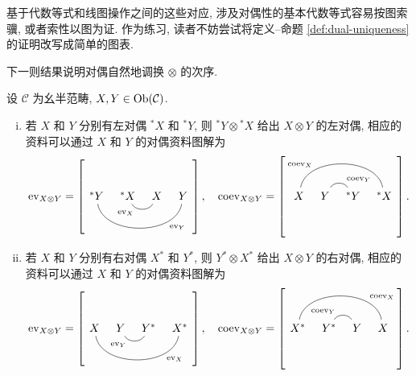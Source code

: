 基于代数等式和线图操作之间的这些对应, 涉及对偶性的基本代数等式容易按图索骥, 或者索性以图为证. 作为练习, 读者不妨尝试将定义--命题 \ref{def:dual-uniqueness} 的证明改写成简单的图表.

下一则结果说明对偶自然地调换 $\otimes$ 的次序.

\begin{proposition}
	设 $\mathcal{C}$ 为幺半范畴, $X, Y \in \operatorname{Ob}(\mathcal{C})$.
	\begin{enumerate}[(i)]
		\item 若 $X$ 和 $Y$ 分别有左对偶 ${}^* X$ 和 ${}^* Y$, 则 ${}^* Y \otimes {}^* X$ 给出 $X \otimes Y$ 的左对偶, 相应的资料可以通过 $X$ 和 $Y$ 的对偶资料图解为
		\begin{equation*}
			\mathrm{ev}_{X \otimes Y} = \left[ \begin{tikzcd}[column sep=tiny, ampersand replacement=\&]
				{}^* Y \arrow[dash, rrr, bend right=80, "{\mathrm{ev}_Y}"' near end] \& {}^* X \arrow[dash, r, bend right=60, "{\mathrm{ev}_X}"' near start] \& X \& Y
			\end{tikzcd}\right], \quad
			\mathrm{coev}_{X \otimes Y} = \left[ \begin{tikzcd}[column sep=tiny, ampersand replacement=\&]
				X \arrow[dash, rrr, bend left=80, "{\mathrm{coev}_X}" near start] \& Y \arrow[dash, r, bend left=60, "{\mathrm{coev}_Y}" near end] \& {}^* Y \& {}^* X
			\end{tikzcd}\right].
		\end{equation*}
		\item 若 $X$ 和 $Y$ 分别有右对偶 $X^*$ 和 $Y^*$, 则 $Y^* \otimes X^*$ 给出 $X \otimes Y$ 的右对偶, 相应的资料可以通过 $X$ 和 $Y$ 的对偶资料图解为
		\begin{equation*}
			\mathrm{ev}_{X \otimes Y} = \left[ \begin{tikzcd}[column sep=tiny, ampersand replacement=\&]
				X \arrow[dash, rrr, bend right=80, "{\mathrm{ev}_X}"' near end] \& Y \arrow[dash, r, bend right=60, "{\mathrm{ev}_Y}"' near start] \& Y^* \& X^*
			\end{tikzcd}\right], \quad
			\mathrm{coev}_{X \otimes Y} = \left[ \begin{tikzcd}[column sep=tiny, ampersand replacement=\&]
				X^* \arrow[dash, rrr, bend left=80, "{\mathrm{coev}_X}" near end] \& Y^* \arrow[dash, r, bend left=60, "{\mathrm{coev}_Y}" near start] \& Y \& X
			\end{tikzcd}\right].
		\end{equation*}
	\end{enumerate}
\end{proposition}
